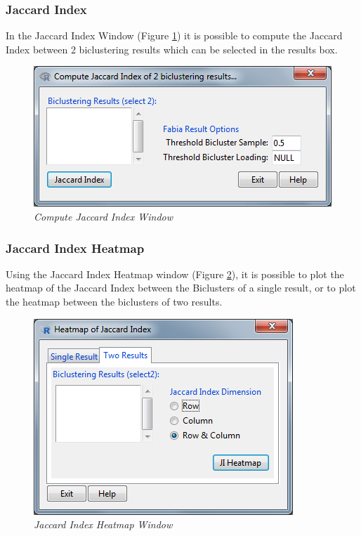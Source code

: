 \documentclass[a4paper]{article}\usepackage[]{graphicx}\usepackage[]{color}
\begin{document}
\subsubsection{Jaccard Index}
\noindent In the Jaccard Index Window (Figure \ref{jaccardindexwindow}) it is
possible to compute the Jaccard Index between 2 biclustering results which can
be selected in the results box.

\begin{figure}[H]
\centering
\includegraphics[scale=0.4]{figures/jaccardindexwindow.png}
\caption{{\it Compute Jaccard Index Window }\label{jaccardindexwindow}}
\end{figure}

\subsubsection{Jaccard Index Heatmap}
Using the Jaccard Index Heatmap window (Figure \ref{jaccardheatmapwindow}), it is possible to plot the heatmap of the Jaccard Index between the Biclusters of a single result, or to plot the heatmap between the biclusters of two results.

\begin{figure}[H]
\centering
\includegraphics[scale=0.4]{figures/jaccardheatmap.png}
\caption{{\it Jaccard Index Heatmap Window }\label{jaccardheatmapwindow}}
\end{figure}
\end{document}
